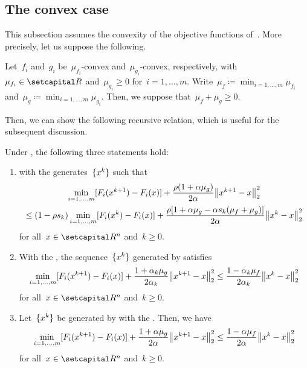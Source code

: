 \documentclass[../../main]{subfiles}
\begin{document}
\subsection{The convex case}
This subsection assumes the convexity of the objective functions of~.
More precisely, let us suppose the following.
\begin{assumption} 
    Let~$f_i$ and~$g_i$ be~$\mu_{f_i}$-convex and~$\mu_{g_i}$-convex, respectively, with~$\mu_{f_i} \in \setR$ and~$\mu_{g_i} \ge 0$ for~$i = 1, \dots, m$.
    Write~$\mu_f \coloneqq \min_{i = 1, \dots, m} \mu_{f_i}$ and~$\mu_g \coloneqq \min_{i = 1, \dots, m} \mu_{g_i}$.
    Then, we suppose that~$\mu_f + \mu_g \ge 0$.
\end{assumption}

Then, we can show the following recursive relation, which is useful for the subsequent discussion.
\begin{lemma} 
    Under , the following three statements hold:
    \begin{enumerate} 
        \item {} with the  generates~$\lbrace x^k\rbrace$ such that
            \begin{multline}
                \min_{i = 1, \dots, m} [F_i(x^{k + 1}) - F_i(x)] + \frac{\rho (1 + \alpha \mu_g)}{2 \alpha} \norm*{x^{k + 1} - x}_2^2 \\
                \le (1 - \rho s_k) \min_{i = 1, \dots, m} [F_i(x^k) - F_i(x)] + \frac{\rho [1 + \alpha \mu_g - \alpha s_k (\mu_f + \mu_g)]}{2 \alpha} \norm*{x^k - x}_2^2
            \end{multline}
            for all~$x \in \setR^n$ and~$k \ge 0$. 
        \item With the , the sequence~$\lbrace x^k\rbrace$ generated by  satisfies 
            \begin{equation}
                \min_{i = 1, \dots, m} [F_i(x^{k + 1}) - F_i(x)] + \frac{1 + \alpha_k \mu_g}{2 \alpha_k} \norm*{x^{k + 1} - x}_2^2 \le \frac{1 - \alpha_k \mu_f}{2 \alpha_k} \norm*{x^k - x}_2^2
            \end{equation}
            for all~$x \in \setR^n$ and~$k \ge 0$. 
        \item Let~$\lbrace x^k\rbrace$ be generated by  with the .
            Then, we have
            \begin{equation}
                \min_{i = 1, \dots, m} [F_i(x^{k + 1}) - F_i(x)] + \frac{1 + \alpha \mu_g}{2 \alpha} \norm*{x^{k + 1} - x}_2^2 \le \frac{1 - \alpha \mu_f}{2 \alpha} \norm*{x^k - x}_2^2
            \end{equation}
            for all~$x \in \setR^n$ and~$k \ge 0$. 
    \end{enumerate}
\end{lemma}
\end{document}
